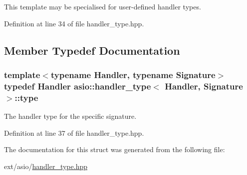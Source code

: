 This template may be specialised for user-\/defined handler types. 

Definition at line 34 of file handler\+\_\+type.\+hpp.



\subsection{Member Typedef Documentation}
\hypertarget{structasio_1_1handler__type_af26f1822b7ff708de592f20a12b140fc}{}
\subsubsection[{type}]{\setlength{\rightskip}{0pt plus 5cm}template$<$typename Handler, typename Signature$>$ typedef Handler {\bf asio\+::handler\+\_\+type}$<$ Handler, Signature $>$\+::{\bf type}}\label{structasio_1_1handler__type_af26f1822b7ff708de592f20a12b140fc}


The handler type for the specific signature. 



Definition at line 37 of file handler\+\_\+type.\+hpp.



The documentation for this struct was generated from the following file\+:\begin{DoxyCompactItemize}
\item 
ext/asio/\hyperlink{handler__type_8hpp}{handler\+\_\+type.\+hpp}\end{DoxyCompactItemize}
